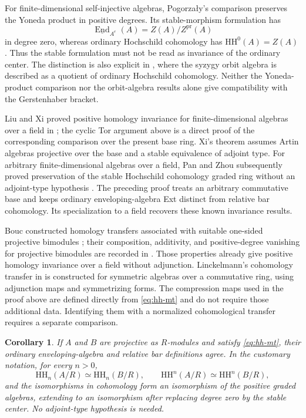 \documentclass[12pt,a4paper,english,reqno]{amsart}
\numberwithin{equation}{section}
\theoremstyle{plain}
\newtheorem{corollary}[theorem]{Corollary}
\theoremstyle{definition}
\begin{document}
For finite-dimensional self-injective algebras, Pogorza{\l}y's
comparison \cite{Pogorzaly2001Hochschild} preserves the Yoneda
product in positive degrees. Its stable-morphism formulation has
\[
 \underline{\operatorname{End}}_{A^e}(A)
       =Z(A)/Z^{\mathrm{pr}}(A)
\]
in degree zero, whereas ordinary Hochschild cohomology has
$\mathrm{HH}^0(A)=Z(A)$. Thus the stable formulation must not be
read as invariance of the ordinary center. The distinction is also
explicit in \cite[Section~1]{Pogorzaly2014Orbit}, where the
syzygy orbit algebra is described as a quotient of ordinary
Hochschild cohomology. Neither the Yoneda-product comparison nor
the orbit-algebra results alone give compatibility with the
Gerstenhaber bracket.

Liu and Xi proved positive homology invariance for
finite-dimensional algebras over a field in
\cite[Theorem~4.4]{LiuXi2005}; the cyclic Tor argument above is
a direct proof of the corresponding comparison over the present base
ring.  Xi's theorem
\cite[Theorem~4.2]{Xi2008} assumes Artin algebras projective over
the base and a stable equivalence of adjoint type.  For arbitrary
finite-dimensional algebras over a field, Pan and Zhou subsequently
proved preservation of the stable Hochschild cohomology graded
ring without an adjoint-type hypothesis
\cite[Theorem~1.2]{PanZhou2010}.  The preceding proof treats an arbitrary
commutative base and keeps ordinary enveloping-algebra Ext distinct from
relative bar cohomology.  Its specialization to a field recovers these
known invariance results.

Bouc constructed homology transfers associated with suitable
one-sided projective bimodules \cite{Bouc1997}; their composition,
additivity, and positive-degree vanishing for projective bimodules
are recorded in \cite[Proposition~2.1]{KoenigLiuZhou2012}.  Those
properties already give positive homology invariance over a
field without adjunction.  Linckelmann's cohomology transfer in
\cite[Section~2]{Linckelmann1999} is constructed for symmetric
algebras over a commutative ring, using adjunction maps and
symmetrizing forms.  The compression maps used in the proof above
are defined directly from \eqref{eq:hh-mt} and do not require
those additional data.  Identifying them with a normalized
cohomological transfer requires a separate comparison.

\begin{corollary}
\label{cor:hh-projective-base}
If $A$ and $B$ are projective as $R$-modules and satisfy
\eqref{eq:hh-mt}, their ordinary enveloping-algebra and relative
bar definitions agree.  In the customary notation, for every
$n>0$,
\[
 \mathrm{HH}_n(A/R)\simeq\mathrm{HH}_n(B/R),
 \qquad
 \mathrm{HH}^{n}(A/R)\simeq\mathrm{HH}^{n}(B/R),
\]
and the isomorphisms in cohomology form an isomorphism of the
positive graded algebras, extending to an isomorphism after
replacing degree zero by the stable center.  No adjoint-type
hypothesis is needed.
\end{corollary}
\end{document}
